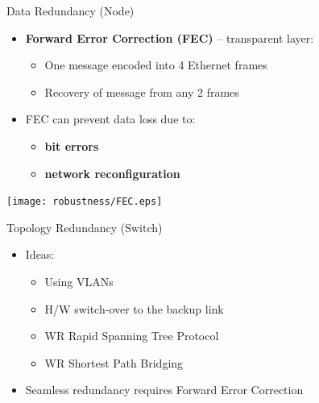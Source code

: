 \documentclass[compress,red]{beamer}
\begin{document}
\begin{frame}{Data Redundancy (Node)}
   
  \begin{itemize}
	\item {\bf Forward Error Correction (FEC)}  -- transparent layer:
	\begin{itemize}
		\item One message encoded into 4 Ethernet frames
		\item Recovery of message from any 2 frames
	\end{itemize}
	\item <2->FEC can prevent data loss due to:
	\begin{itemize}	
		\item<3-> {\bf bit errors} 
		\item<4> {\bf network reconfiguration}
	\end{itemize}	
  \end{itemize}
  
  	\begin{center}
      \texttt{[image: robustness/FEC.eps]}
    \end{center}
  
\end{frame}

\begin{frame}{Topology Redundancy (Switch)}

  \begin{itemize}
	\item Ideas:
	\begin{itemize}
        \item Using VLANs
        \item H/W switch-over to the backup link
	      \item WR Rapid Spanning Tree Protocol
	      \item WR Shortest Path Bridging
	\end{itemize}
	\item Seamless redundancy requires Forward Error Correction
  \end{itemize}
  
\end{frame}

\subsection{}
\end{document}
